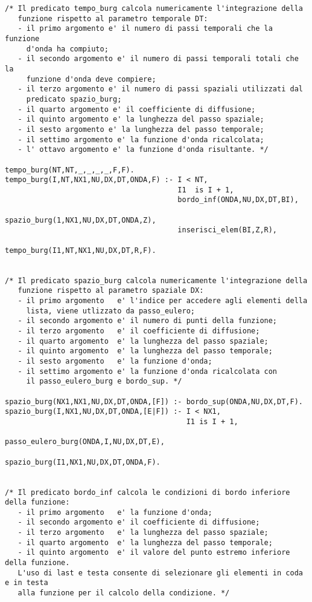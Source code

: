 \begin{verbatim}
/* Il predicato tempo_burg calcola numericamente l'integrazione della
   funzione rispetto al parametro temporale DT:
   - il primo argomento e' il numero di passi temporali che la funzione
     d'onda ha compiuto;
   - il secondo argomento e' il numero di passi temporali totali che la
     funzione d'onda deve compiere; 
   - il terzo argomento e' il numero di passi spaziali utilizzati dal
     predicato spazio_burg;
   - il quarto argomento e' il coefficiente di diffusione;         
   - il quinto argomento e' la lunghezza del passo spaziale;
   - il sesto argomento e' la lunghezza del passo temporale;
   - il settimo argomento e' la funzione d'onda ricalcolata;
   - l' ottavo argomento e' la funzione d'onda risultante. */

tempo_burg(NT,NT,_,_,_,_,F,F).
tempo_burg(I,NT,NX1,NU,DX,DT,ONDA,F) :- I < NT,
                                        I1  is I + 1,
                                        bordo_inf(ONDA,NU,DX,DT,BI),
                                        spazio_burg(1,NX1,NU,DX,DT,ONDA,Z),
                                        inserisci_elem(BI,Z,R),
                                        tempo_burg(I1,NT,NX1,NU,DX,DT,R,F).


/* Il predicato spazio_burg calcola numericamente l'integrazione della
   funzione rispetto al parametro spaziale DX:
   - il primo argomento   e' l'indice per accedere agli elementi della 
     lista, viene utlizzato da passo_eulero; 
   - il secondo argomento e' il numero di punti della funzione; 
   - il terzo argomento   e' il coefficiente di diffusione;  
   - il quarto argomento  e' la lunghezza del passo spaziale;
   - il quinto argomento  e' la lunghezza del passo temporale;
   - il sesto argomento   e' la funzione d'onda;
   - il settimo argomento e' la funzione d'onda ricalcolata con 
     il passo_eulero_burg e bordo_sup. */

spazio_burg(NX1,NX1,NU,DX,DT,ONDA,[F]) :- bordo_sup(ONDA,NU,DX,DT,F).
spazio_burg(I,NX1,NU,DX,DT,ONDA,[E|F]) :- I < NX1,
                                          I1 is I + 1,
                                          passo_eulero_burg(ONDA,I,NU,DX,DT,E),
                                          spazio_burg(I1,NX1,NU,DX,DT,ONDA,F).


/* Il predicato bordo_inf calcola le condizioni di bordo inferiore della funzione:
   - il primo argomento   e' la funzione d'onda;
   - il secondo argomento e' il coefficiente di diffusione;
   - il terzo argomento   e' la lunghezza del passo spaziale;
   - il quarto argomento  e' la lunghezza del passo temporale;
   - il quinto argomento  e' il valore del punto estremo inferiore della funzione.
   L'uso di last e testa consente di selezionare gli elementi in coda e in testa
   alla funzione per il calcolo della condizione. */


\end{verbatim}
